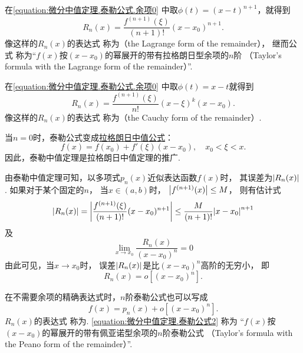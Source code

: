 在\cref{equation:微分中值定理.泰勒公式.余项0} 中取\(\phi(t) = (x-t)^{n+1}\)，就得到
\begin{equation}\label{equation:微分中值定理.泰勒公式.余项1}
	R_n(x) = \frac{f^{(n+1)}(\xi)}{(n+1)!} (x-x_0)^{n+1}.
\end{equation}
像这样的\(R_n(x)\)的表达式 
称为（the Lagrange form of the remainder），
继而公式 
称为“\(f(x)\)按\((x-x_0)\)的幂展开的带有拉格朗日型余项的\(n\)阶
（Taylor's formula with the Lagrange form of the remainder）”.

在\cref{equation:微分中值定理.泰勒公式.余项0} 中取\(\phi(t) = x-t\)就得到
\begin{equation}\label{equation:微分中值定理.泰勒公式.余项4}
	R_n(x) = \frac{f^{(n+1)}(\xi)}{n!} (x-\xi)^k (x-x_0).
\end{equation}
像这样的\(R_n(x)\)的表达式 
称为（the Cauchy form of the remainder）.

当\(n=0\)时，泰勒公式变成\hyperref[equation:微分中值定理.拉格朗日中值公式]{拉格朗日中值公式}：\[
	f(x) = f(x_0) + f'(\xi) (x-x_0), \quad x_0 < \xi < x.
\]
因此，泰勒中值定理是拉格朗日中值定理的推广.

由泰勒中值定理可知，以多项式\(p_n(x)\)近似表达函数\(f(x)\)时，
其误差为\(\abs{R_n(x)}\).
如果对于某个固定的\(n\)，
当\(x\in(a,b)\)时，
\(\abs{f^{(n+1)}(x)} \leq M\)，
则有估计式\begin{equation}\label{equation:微分中值定理.泰勒公式.误差1}
	\abs{R_n(x)}
	= \abs{\frac{f^{(n+1)}(\xi)}{(n+1)!} (x-x_0)^{n+1}}
	\leq \frac{M}{(n+1)!} \abs{x-x_0}^{n+1}
\end{equation}
及\[
	\lim_{x \to x_0} \frac{R_n(x)}{(x-x_0)^n} = 0
\]
由此可见，当\(x \to x_0\)时，
误差\(\abs{R_n(x)}\)是比\((x-x_0)^n\)高阶的无穷小，
即\begin{equation}\label{equation:微分中值定理.泰勒公式.余项2}
	R_n(x) = o[(x-x_0)^n].
\end{equation}

在不需要余项的精确表达式时，\(n\)阶泰勒公式也可以写成
\begin{equation}\label{equation:微分中值定理.泰勒公式2}
	f(x) = p_n(x) + o[(x - x_0)^n].
\end{equation}
\(R_n(x)\)的表达式  称为.
\cref{equation:微分中值定理.泰勒公式2} 称为
“\(f(x)\)按\((x-x_0)\)的幂展开的带有佩亚诺型余项的\(n\)阶泰勒公式
（Taylor's formula with the Peano form of the remainder）”.


